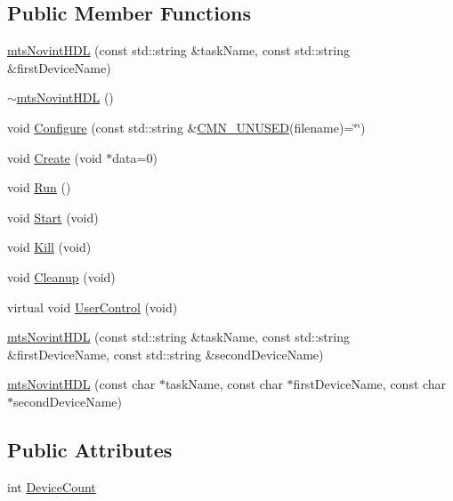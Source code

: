 \subsection*{Public Member Functions}
\begin{DoxyCompactItemize}
\item 
\hyperlink{classmts_novint_h_d_l_a1bf1c724f38544e9b0c58fbf31619e6e}{mts\+Novint\+H\+D\+L} (const std\+::string \&task\+Name, const std\+::string \&first\+Device\+Name)
\item 
\hyperlink{classmts_novint_h_d_l_a75b849be3d5bd239ef7df3f1ec187a74}{$\sim$mts\+Novint\+H\+D\+L} ()
\item 
void \hyperlink{classmts_novint_h_d_l_ab6df53b1e9ab9f557022d60694950c78}{Configure} (const std\+::string \&\hyperlink{cmn_portability_8h_a021894e2626935fa2305434b1e893ff6}{C\+M\+N\+\_\+\+U\+N\+U\+S\+E\+D}(filename)=\char`\"{}\char`\"{})
\item 
void \hyperlink{classmts_novint_h_d_l_ab07ce6cde2e9b851c291f61a1332ca63}{Create} (void $\ast$data=0)
\item 
void \hyperlink{classmts_novint_h_d_l_a95c92d72b00ec707b16f58d464194cf6}{Run} ()
\item 
void \hyperlink{classmts_novint_h_d_l_afec4fe7476f0529bb9bb3c491e220f9c}{Start} (void)
\item 
void \hyperlink{classmts_novint_h_d_l_a1a0ada52f3d96ed663e0f34ebbe0e629}{Kill} (void)
\item 
void \hyperlink{classmts_novint_h_d_l_a2294c634ec80b3fd9c922358e222661d}{Cleanup} (void)
\item 
virtual void \hyperlink{classmts_novint_h_d_l_ac345d2943221ae4239d50fbeb24fde7a}{User\+Control} (void)
\end{DoxyCompactItemize}
{\bf }\par
\begin{DoxyCompactItemize}
\item 
\hyperlink{classmts_novint_h_d_l_aab86717089d85224c9ecc12696ee34e7}{mts\+Novint\+H\+D\+L} (const std\+::string \&task\+Name, const std\+::string \&first\+Device\+Name, const std\+::string \&second\+Device\+Name)
\item 
\hyperlink{classmts_novint_h_d_l_a7081a83693b4cb1053ae63e525536af6}{mts\+Novint\+H\+D\+L} (const char $\ast$task\+Name, const char $\ast$first\+Device\+Name, const char $\ast$second\+Device\+Name)
\end{DoxyCompactItemize}

\subsection*{Public Attributes}
\begin{DoxyCompactItemize}
\item 
int \hyperlink{classmts_novint_h_d_l_a7e7e29f297ded7d1c14a92fab0df7ca0}{Device\+Count}
\end{DoxyCompactItemize}
